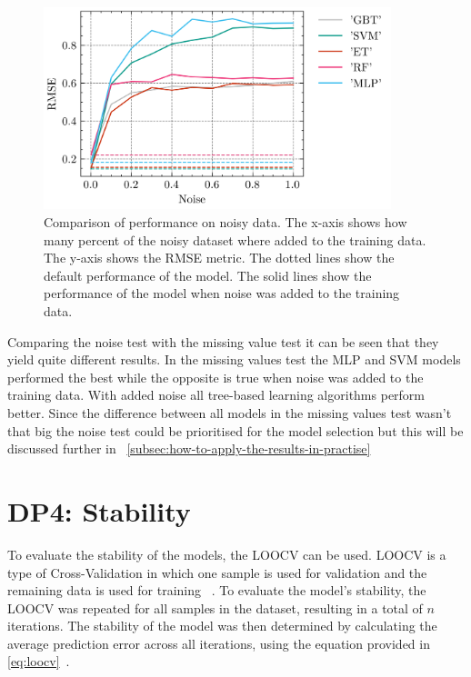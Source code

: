 \begin{figure}[h]
    \begin{tcolorbox}[arc=0pt,boxrule=0.5pt]
        \centering
        \includegraphics[width=0.9\textwidth]{chap5/images/results_noise}
    \end{tcolorbox}
    \caption{Comparison of performance on noisy data.
    The x-axis shows how many percent of the noisy dataset where added to the training data.
    The y-axis shows the RMSE metric.
    The dotted lines show the default performance of the model.
    The solid lines show the performance of the model when noise was added to the training data.
    }
    \label{fig:results-noise-fig}
\end{figure}

Comparing the noise test with the missing value test it can be seen that they yield quite different results.
In the missing values test the \ac{MLP} and \ac{SVM} models performed the best while the opposite is true when noise
was added to the training data.
With added noise all tree-based learning algorithms perform better.
Since the difference between all models in the missing values test wasn't that big the noise test could be
prioritised for the model selection but this will be discussed further in
~\cref{subsec:how-to-apply-the-results-in-practise}


\section{DP4: Stability}\label{sec:stability}
To evaluate the stability of the models, the \ac{LOOCV} can be used.
LOOCV is a type of Cross-Validation in which one sample is used for validation and the remaining data is used for
training
~\cite[p. 200--201]{gareth2013introduction}.
To evaluate the model's stability, the \ac{LOOCV} was repeated for all samples in the dataset, resulting in a total
of $n$ iterations.
The stability of the model was then determined by calculating the average prediction error across all iterations,
using the equation provided in \cref{eq:loocv}~\cite[p. 201]{gareth2013introduction}.

